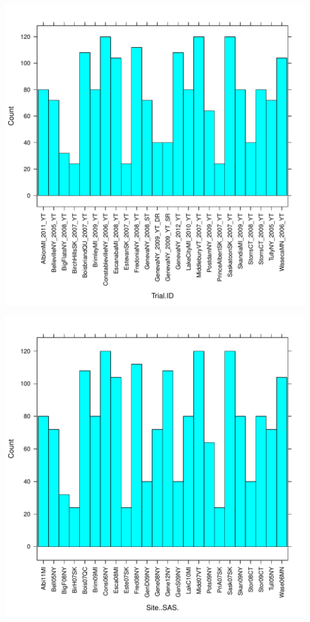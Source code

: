 \documentclass{article}\usepackage[]{graphicx}\usepackage[]{color}
\makeatletter
\def\maxwidth{ %
  \ifdim\Gin@nat@width>\linewidth
    \linewidth
  \else
    \Gin@nat@width
  \fi
}
\newenvironment{knitrout}{}{} %
\makeatother
\begin{document}
\begin{knitrout}
{}




{\centering \includegraphics[width=\maxwidth]{figure/HistogramsDescriptorVariables-3} 

}




{\centering \includegraphics[width=\maxwidth]{figure/HistogramsDescriptorVariables-4} 

}
\end{knitrout}
\end{document}
